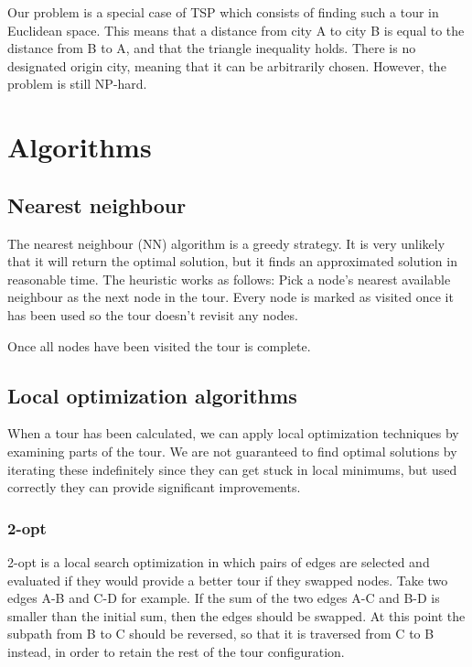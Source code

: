 \documentclass[paper=a4, fontsize=11pt,numbers=endperiod]{scrartcl} %
\numberwithin{equation}{section} %
\numberwithin{figure}{section} %
\numberwithin{table}{section} %
\begin{document}
Our problem is a special case of TSP which consists of finding such a tour in Euclidean space. This means that a distance from city A to city B is equal to the distance from B to A, and that the triangle inequality holds. There is no designated origin city, meaning that it can be arbitrarily chosen.
However, the problem is still NP-hard.

\section{Algorithms}

\subsection{Nearest neighbour}
The nearest neighbour (NN) algorithm is a greedy strategy.
It is very unlikely that it will return the optimal solution, but it finds an approximated solution in reasonable time.
The heuristic works as follows: 
Pick a node's nearest available neighbour as the next node in the tour.
Every node is marked as visited once it has been used so the tour doesn't revisit any nodes.

Once all nodes have been visited the tour is complete.

\subsection{Local optimization algorithms}
When a tour has been calculated, we can apply local optimization techniques by examining parts of the tour. We are not guaranteed to find optimal solutions by iterating these indefinitely since they can get stuck in local minimums, but used correctly they can provide significant improvements.

\subsubsection{2-opt}
2-opt is a local search optimization in which pairs of edges are selected and evaluated if they would provide a better tour if they swapped nodes.
Take two edges A-B and C-D for example.
If the sum of the two edges A-C and B-D is smaller than the initial sum, then the edges should be swapped.
At this point the subpath from B to C should be reversed, so that it is traversed from C to B instead, in order to retain the rest of the tour configuration.
\end{document}
